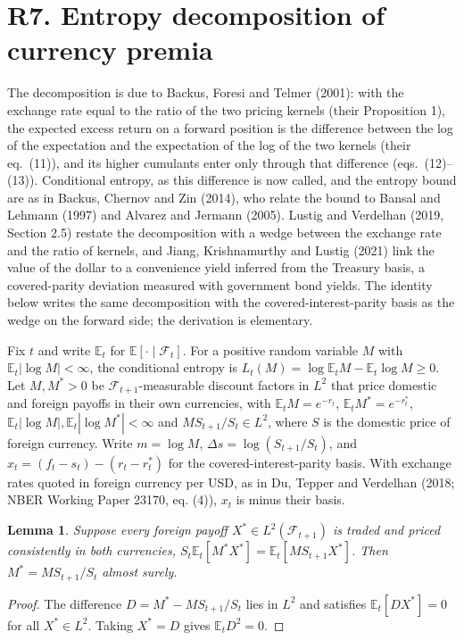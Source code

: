 \documentclass[11pt]{article}
\newtheorem{lemma}[proposition]{Lemma}
\theoremstyle{remark}
\newcommand{\E}{\mathbb{E}}
\begin{document}
\section*{R7. Entropy decomposition of currency premia}

The decomposition is due to Backus, Foresi and Telmer (2001): with the exchange rate equal to the ratio of the two pricing kernels (their Proposition 1), the expected excess return on a forward position is the difference between the log of the expectation and the expectation of the log of the two kernels (their eq.~(11)), and its higher cumulants enter only through that difference (eqs.~(12)--(13)). Conditional entropy, as this difference is now called, and the entropy bound are as in Backus, Chernov and Zin (2014), who relate the bound to Bansal and Lehmann (1997) and Alvarez and Jermann (2005). Lustig and Verdelhan (2019, Section 2.5) restate the decomposition with a wedge between the exchange rate and the ratio of kernels, and Jiang, Krishnamurthy and Lustig (2021) link the value of the dollar to a convenience yield inferred from the Treasury basis, a covered-parity deviation measured with government bond yields. The identity below writes the same decomposition with the covered-interest-parity basis as the wedge on the forward side; the derivation is elementary.

Fix $t$ and write $\E_t$ for $\E[\cdot\mid\mathcal F_t]$. For a positive random variable $M$ with $\E_t|\log M|<\infty$, the conditional entropy is $L_t(M)=\log\E_tM-\E_t\log M\ge0$. Let $M,M^*>0$ be $\mathcal F_{t+1}$-measurable discount factors in $L^2$ that price domestic and foreign payoffs in their own currencies, with $\E_tM=e^{-r_t}$, $\E_tM^*=e^{-r^*_t}$, $\E_t|\log M|,\E_t|\log M^*|<\infty$ and $MS_{t+1}/S_t\in L^2$, where $S$ is the domestic price of foreign currency. Write $m=\log M$, $\Delta s=\log(S_{t+1}/S_t)$, and $x_t=(f_t-s_t)-(r_t-r^*_t)$ for the covered-interest-parity basis. With exchange rates quoted in foreign currency per USD, as in Du, Tepper and Verdelhan (2018; NBER Working Paper 23170, eq. (4)), $x_t$ is minus their basis.

\begin{lemma}
Suppose every foreign payoff $X^*\in L^2(\mathcal F_{t+1})$ is traded and priced consistently in both currencies, $S_t\E_t[M^*X^*]=\E_t[MS_{t+1}X^*]$. Then $M^*=MS_{t+1}/S_t$ almost surely.
\end{lemma}

\begin{proof}
The difference $D=M^*-MS_{t+1}/S_t$ lies in $L^2$ and satisfies $\E_t[DX^*]=0$ for all $X^*\in L^2$. Taking $X^*=D$ gives $\E_tD^2=0$.
\end{proof}
\end{document}
